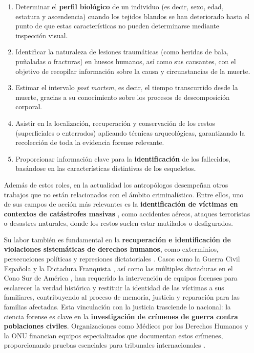 \begin{enumerate}

    \item Determinar el \textbf{perfil biológico} de un individuo (es decir, sexo, edad, estatura y ascendencia) 
    cuando los tejidos blandos se han deteriorado hasta el punto de que estas características no pueden determinarse
    mediante inspección visual. 

    \item Identificar la naturaleza de lesiones traumáticas (como heridas de bala, puñaladas o fracturas) en huesos humanos, 
    así como sus causantes, con el objetivo de recopilar información sobre la causa y circunstancias de la muerte.

    \item Estimar el intervalo \textit{post mortem}, es decir, el tiempo transcurrido desde la muerte, gracias a su 
    conocimiento sobre los procesos de descomposición corporal.
    
    \item Asistir en la localización, recuperación y conservación de los restos (superficiales o enterrados) aplicando 
    técnicas arqueológicas, garantizando la recolección de toda la evidencia forense relevante.

    \item Proporcionar información clave para la \textbf{identificación} de los fallecidos, basándose en las características
    distintivas de los esqueletos.

\end{enumerate}

Además de estos roles, en la actualidad los antropólogos desempeñan otros trabajos que no están relacionados con el ámbito 
criminalístico. Entre ellos, uno de sus campos de acción más relevantes es la \textbf{identificación de víctimas en contextos 
de catástrofes masivas} \cite{deBoer2019, prinz2007, beauthier2009}, como accidentes aéreos, ataques terroristas o desastres 
naturales, donde los restos suelen estar mutilados o desfigurados.

Su labor también es fundamental en la \textbf{recuperación e identificación de violaciones sistemáticas de
derechos humanos}, como exterminios, persecuciones políticas y represiones dictatoriales \cite{skinner2003}.
Casos como la Guerra Civil Española y la Dictadura Franquista \cite{sanchisgimeno2024, baeta2015}, así como 
las múltiples dictaduras en el Cono Sur de América \cite{ataliva2024}, han requerido la intervención de 
equipos forenses para esclarecer la verdad histórica y restituir la identidad de las víctimas a sus 
familiares, contribuyendo al proceso de memoria, justicia y reparación para las familias afectadas.
Esta vinculación con la justicia trasciende lo nacional: la ciencia forense es clave en la \textbf{investigación 
de crímenes de guerra contra poblaciones civiles}. Organizaciones como Médicos por los Derechos Humanos y la 
ONU financian equipos especializados que documentan estos crímenes, proporcionando pruebas esenciales para 
tribunales internacionales \cite{tanaka2020}.

